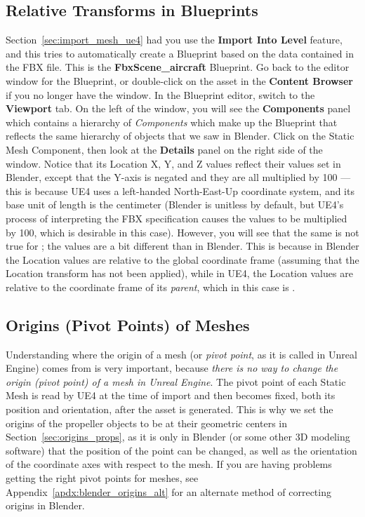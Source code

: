 \subsection{Relative Transforms in Blueprints}
Section~\ref{sec:import_mesh_ue4} had you use the \textbf{Import Into Level} feature, and this tries to automatically create a Blueprint based on the data contained in the FBX file. This is the \textbf{FbxScene\_aircraft} Blueprint. Go back to the editor window for the Blueprint, or double-click on the asset in the \textbf{Content Browser} if you no longer have the window. In the Blueprint editor, switch to the \textbf{Viewport} tab. On the left of the window, you will see the \textbf{Components} panel which contains a hierarchy of \textit{Components} which make up the Blueprint that reflects the same hierarchy of objects that we saw in Blender. Click on the  Static Mesh Component, then look at the \textbf{Details} panel on the right side of the window. Notice that its Location X, Y, and Z values reflect their values set in Blender, except that the Y-axis is negated and they are all multiplied by 100 --- this is because UE4 uses a left-handed North-East-Up coordinate system, and its base unit of length is the centimeter (Blender is unitless by default, but UE4's process of interpreting the FBX specification causes the values to be multiplied by 100, which is desirable in this case). However, you will see that the same is not true for ; the values are a bit different than in Blender. This is because in Blender the Location values are relative to the global coordinate frame (assuming that the Location transform has not been applied), while in UE4, the Location values are relative to the coordinate frame of its \textit{parent}, which in this case is .

\subsection{Origins (Pivot Points) of Meshes}
Understanding where the origin of a mesh (or \textit{pivot point}, as it is called in Unreal Engine) comes from is very important, because \textit{there is no way to change the origin (pivot point) of a mesh in Unreal Engine}. The pivot point of each Static Mesh is read by UE4 at the time of import and then becomes fixed, both its position and orientation, after the asset is generated. This is why we set the origins of the propeller objects to be at their geometric centers in Section~\ref{sec:origins_props}, as it is only in Blender (or some other 3D modeling software) that the position of the point can be changed, as well as the orientation of the coordinate axes with respect to the mesh. If you are having problems getting the right pivot points for meshes, see Appendix~\ref{apdx:blender_origins_alt} for an alternate method of correcting origins in Blender.

